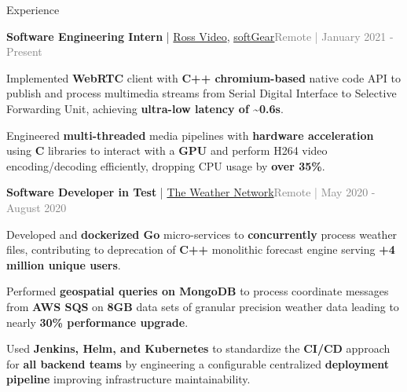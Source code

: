 \documentclass[hidelinks]{resume} %
\begin{document}
\begin{rSection}{Experience}
\begin{rSubsection}{\textbf{Software Engineering Intern} | \href{https://www.rossvideo.com/}{Ross Video}, \href{https://www.rossvideo.com/products-services/infrastructure/softgear-software-based-signal-processing-platform/}{\underline{softGear}}}{\textcolor{gray}{Remote | January 2021 - Present}}{}

    \begin{bulletpoints}
        \vspace{-.10cm}
        \item Implemented \textbf{WebRTC} client with \textbf{C++ chromium-based} native code API to publish and process multimedia streams from Serial Digital Interface to Selective Forwarding Unit, achieving \textbf{ultra-low latency of \textasciitilde0.6s}.
        \vspace{-.13cm}
        \item Engineered \textbf{multi-threaded} media pipelines with \textbf{hardware acceleration} using \textbf{C} libraries to interact with a \textbf{GPU} and perform H264 video encoding/decoding efficiently, dropping CPU usage by \textbf{over 35\%}.
        \vspace{-.10cm}
    \end{bulletpoints}
    \vspace{-.25cm}
\end{rSubsection}
\begin{rSubsection}{\textbf{Software Developer in Test} | \href{https://www.theweathernetwork.com/}{The Weather Network}}{\textcolor{gray}{Remote | May 2020 - August 2020}}{}
        \par
        \begin{bulletpoints}
            \vspace{-.10cm}
            \item Developed and \textbf{dockerized Go} micro-services to \textbf{concurrently} process weather files, contributing to deprecation of \textbf{C++} monolithic forecast engine serving \textbf{+4 million unique users}.
             \vspace{-.13cm}
            \item Performed \textbf{geospatial queries on MongoDB} to process coordinate messages from \textbf{AWS SQS} on \textbf{8GB} data sets of granular precision weather data leading to nearly \textbf{30\% performance upgrade}.
            \vspace{-.13cm}
             \item Used \textbf{Jenkins, Helm, and Kubernetes} to standardize the \textbf{CI/CD} approach for \textbf{all backend teams} by engineering a configurable centralized \textbf{deployment pipeline} improving infrastructure maintainability.

\end{bulletpoints}
\end{rSubsection}
\end{rSection}
\end{document}
